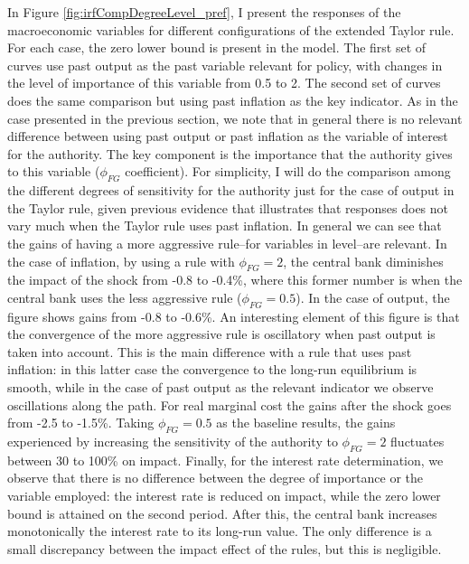 \documentclass[12pt]{article}
\numberwithin{equation}{section}
\begin{document}
In Figure \ref{fig:irfCompDegreeLevel_pref}, I present the responses of the macroeconomic variables for different configurations of the extended Taylor rule. For each case, the zero lower bound is present in the model. The first set of curves use past output as the past variable relevant for policy, with changes in the level of importance of this variable from 0.5 to 2. The second set of curves does the same comparison but using past inflation as the key indicator. As in the case presented in the previous section, we note that in general there is no relevant difference between using past output or past inflation as the variable of interest for the authority. The key component is the importance that the authority gives to this variable ($\phi_{FG}$ coefficient). For simplicity, I will do the comparison among the different degrees of sensitivity for the authority just for the case of output in the Taylor rule, given previous evidence that illustrates that responses does not vary much when the Taylor rule uses past inflation. In general we can see that the gains of having a more aggressive rule--for variables in level--are relevant. In the case of inflation, by using a rule with $\phi_{FG}=2$, the central bank diminishes the impact of the shock from -0.8 to -0.4\%, where this former number is when the central bank uses the less aggressive rule ($\phi_{FG}=0.5$). In the case of output, the figure shows gains from -0.8 to -0.6\%. An interesting element of this figure is that the convergence of the more aggressive rule is oscillatory when past output is taken into account. This is the main difference with a rule that uses past inflation: in this latter case the convergence to the long-run equilibrium is smooth, while in the case of past output as the relevant indicator we observe oscillations along the path. For real marginal cost the gains after the shock goes from -2.5 to -1.5\%. Taking $\phi_{FG}=0.5$ as the baseline results, the gains experienced by increasing the sensitivity of the authority to $\phi_{FG}=2$ fluctuates between 30 to 100\% on impact. Finally, for the interest rate determination, we observe that there is no difference between the degree of importance or the variable employed: the interest rate is reduced on impact, while the zero lower bound is attained on the second period. After this, the central bank increases monotonically the interest rate to its long-run value. The only difference is a small discrepancy between the impact effect of the rules, but this is negligible.

\end{document}
